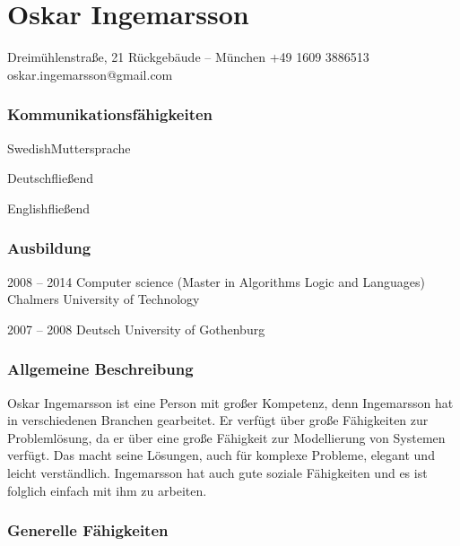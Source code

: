 \documentclass[fontsize=10pt]{tccv}
\begin{document}
\part{Oskar Ingemarsson}

\personal
    {Dreimühlenstra{\ss}e, 21 Rückgebäude -- München}
    {+49 1609 3886513}
    {oskar.ingemarsson@gmail.com}

\section{Kommunikationsfähigkeiten}

\begin{factlist}
\item{Swedish}{Muttersprache}
\item{Deutsch}{fließend}
\item{English}{fließend}

\end{factlist}

\section{Ausbildung}

\begin{yearlist}
\item{2008 -- 2014}
     {Computer science (Master in Algorithms Logic and Languages)}
     {Chalmers University of Technology}
\item{2007 -- 2008}
    {Deutsch}
    {University of Gothenburg}
\end{yearlist}

\section{Allgemeine Beschreibung}

Oskar Ingemarsson ist eine Person mit großer Kompetenz, denn Ingemarsson hat in
verschiedenen Branchen gearbeitet. Er verfügt über große Fähigkeiten zur
Problemlösung, da er über eine große Fähigkeit zur Modellierung von Systemen
verfügt. Das macht seine Lösungen, auch für komplexe Probleme, elegant und
leicht verständlich. Ingemarsson hat auch gute soziale
Fähigkeiten und es ist folglich einfach mit ihm zu arbeiten.

\section{Generelle Fähigkeiten}
\end{document}

